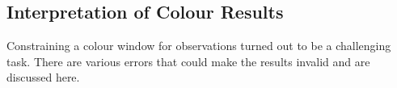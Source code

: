 

	\subsection{Interpretation of Colour Results}
	\label{sub:Interp_Colour}
		Constraining a colour window for observations turned out to be a challenging task. There are various errors that could make the results invalid and are discussed here.


